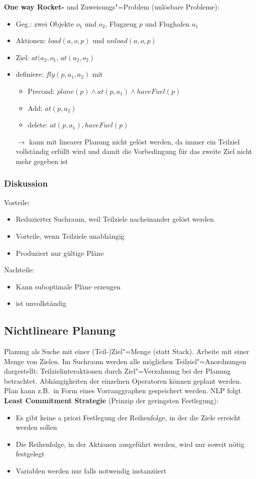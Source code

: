 \textbf{One way Rocket-} und Zuweisungs"=Problem (unlösbare Probleme):
\begin{itemize}
	\item Geg.: zwei Objekte $o_1$ und $o_2$, Flugzeug $p$ und Flughafen $a_1$
	\item Aktionen: $load(a,o,p)$ und $unload(a,o,p)$
	\item Ziel: $at(a_2, o_1$, $at(a_2, o_2)$
	\item definiere: $fly(p,a_1,a_2)$ mit
	\begin{itemize}
		\item Precond: $plane(p) \wedge at(p,a_1) \wedge haveFuel(p)$
		\item Add: $at(p,a_2)$
		\item delete: $at(p,a_1), haveFuel(p)$
	\end{itemize}
	\item[$\rightarrow$] kann mit linearer Planung nicht gelöst werden, da immer ein Teilziel vollständig erfüllt wird und damit die Vorbedingung für das zweite Ziel nicht mehr gegeben ist
\end{itemize}

\subsubsection{Diskussion}
Vorteile:
\begin{itemize}
	\item Reduzierter Suchraum, weil Teilziele nacheinander gelöst werden
	\item Vorteile, wenn Teilziele unabhängig
	\item Produziert nur gültige Pläne
\end{itemize}
Nachteile:
\begin{itemize}
	\item Kann suboptimale Pläne erzeugen
	\item ist unvollständig
\end{itemize}

\subsection{Nichtlineare Planung}
\label{ch06_nichtlinearePlanung}
Planung als Suche mit einer (Teil-)Ziel"=Menge (statt Stack). Arbeite mit einer Menge von Zielen.
Im Suchraum werden alle möglichen Teilziel"=Anordnungen dargestellt: Teilzielinteraktionen durch Ziel"=Verzahnung bei der Planung betrachtet.
Abhängigkeiten der einzelnen Operatoren können geplant werden.
Plan kann z.B.\ in Form eines Vorranggraphen gespeichert werden.
NLP folgt \textbf{Least Commitment Strategie} (Prinzip der geringsten Festlegung):
\begin{itemize}
	\item Es gibt keine a priori Festlegung der Reihenfolge, in der die Ziele erreicht werden sollen
	\item Die Reihenfolge, in der Aktionen ausgeführt werden, wird nur soweit nötig festgelegt
	\item Variablen werden nur falls notwendig instanziiert
\end{itemize}

